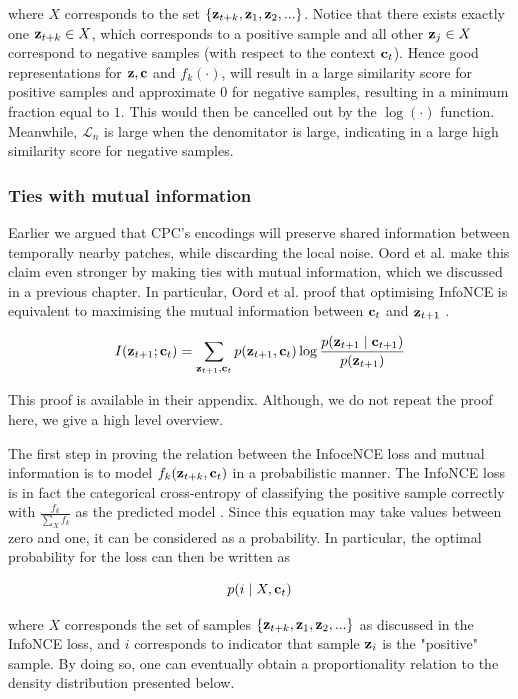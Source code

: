 	where $X$ corresponds to the set ${ \left\{ \mathbf{z}_{t+k}, \mathbf{z}_1, \mathbf{z}_2, ... \right\} }$. Notice that there exists exactly one $\mathbf{z}_{t+k} \in X$, which corresponds to a positive sample and all other $\mathbf{z}_j \in X$ correspond to negative samples (with respect to the context $\mathbf{c}_t$).  Hence good representations for $\mathbf{z}, \mathbf{c}$ and $f_k(\cdot)$, will result in a large similarity score for positive samples and approximate $0$ for negative samples, resulting in a minimum fraction equal to $1$. This would then be cancelled out by the $\log(\cdot)$ function. Meanwhile, $\mathcal{L}_n$ is large when the denomitator is large, indicating in a large high similarity score for negative samples.
	
\subsubsection{Ties with mutual information}
	Earlier we argued that CPC's encodings will preserve shared information between temporally nearby patches, while discarding the local noise. Oord et al. make this claim even stronger by making ties with mutual information, which we discussed in a previous chapter. In particular, Oord et al. proof that optimising InfoNCE is equivalent to maximising the mutual information between $\mathbf{c}_t$ and $\mathbf{z}_{t+1}$ \cite{oordRepresentationLearningContrastive2019}. 
	
	\begin{equation} %
		I(\ztone; \ct) = \sum_{\ztone, \ct} p(\ztone, \ct) \log \frac{p(\ztone \mid \ctone)}{p(\ztone)}
	\end{equation}
	
	This proof is available in their appendix. Although, we do not repeat the proof here, we give a high level overview.
	
	The first step in proving the relation between the InfoceNCE loss and mutual information is to model $f_k(\mathbf{z}_{t+k}, \mathbf{c}_t)$ in a probabilistic manner. The InfoNCE loss is in fact the categorical cross-entropy of classifying the positive sample correctly with $\frac{f_k}{\sum_{X} f_k}$ as the predicted model \cite{oordRepresentationLearningContrastive2019}. Since this equation may take values between zero and one, it can be considered as a probability. In particular, the optimal probability for the loss can then be written as 

	$$p(i \mid X, \mathbf{c}_t)$$
	
	where $X$ corresponds the set of samples  ${ \left\{ \mathbf{z}_{t+k}, \mathbf{z}_1, \mathbf{z}_2, ... \right\} }$  as discussed in the InfoNCE loss, and $i$ corresponds to indicator that sample $\mathbf{z}_i$ is the "positive" sample. By doing so, one can eventually obtain a proportionality relation to the density distribution presented below. 
	
